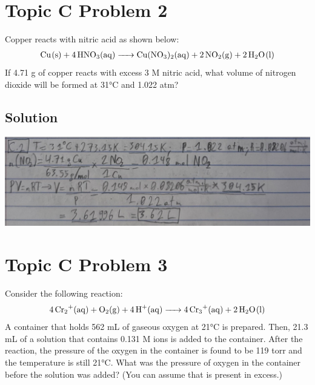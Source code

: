 \documentclass[10pt]{article}
\begin{document}
    \pagebreak
    \section{Topic C Problem 2}
        Copper reacts with nitric acid as shown below:
        \begin{gather}
            \ce{Cu(s) + 4 HNO3(aq) -> Cu(NO3)2(aq) + 2 NO2(g) + 2 H2O(l)}
        \end{gather}
        If 4.71 g of copper reacts with excess 3 M nitric acid, what volume of nitrogen dioxide will be formed at 31\unit{\celsius} and 1.022 atm?

        \subsection{Solution}
            \begin{center}
                \includegraphics[width=\textwidth]{Answers Images/answer_C_2.jpg}
            \end{center}

    \pagebreak
    \section{Topic C Problem 3}
        Consider the following reaction:
        \begin{gather}
            \ce{4 Cr2+(aq) + O2(g) + 4 H+(aq) -> 4 Cr3+(aq) + 2 H2O(l)}
        \end{gather}
        A container that holds 562 mL of gaseous oxygen at 21\unit{\celsius} is prepared. 
        Then, 21.3 mL of a solution that contains 0.131 M  ions is added to the container. 
        After the reaction, the pressure of the oxygen in the container is found to be 119 torr and the temperature is still 21\unit{\celsius}.
        What was the pressure of oxygen in the container before the  solution was added? 
        (You can assume that  is present in excess.)
\end{document}
